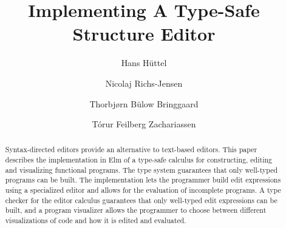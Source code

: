 \documentclass[sigplan,screen]{acmart}
\begin{document}

%
\title{Implementing A Type-Safe Structure Editor}
%
%


\author[Hüttel]{Hans Hüttel}

  
\author[Richs-Jensen]{Nicolaj Richs-Jensen}


\author[Bringgaard]{Thorbjørn Bülow Bringgaard}


\author[Zachariassen]{Tórur Feilberg Zachariassen}

  

%
%
%

%
 \begin{abstract}
   Syntax-directed editors provide an alternative to text-based
   editors. This paper describes the implementation in Elm of a
   type-safe calculus for constructing, editing and visualizing
   functional programs. The type system guarantees that only
   well-typed programs can be built. The implementation lets the
   programmer build edit expressions using a specialized editor and
   allows for the evaluation of incomplete programs. A type checker
   for the editor calculus guarantees that only well-typed edit
   expressions can be built, and a program visualizer allows the
   programmer to choose between different visualizations of code and
   how it is edited and evaluated.
\end{abstract}
\end{document}
